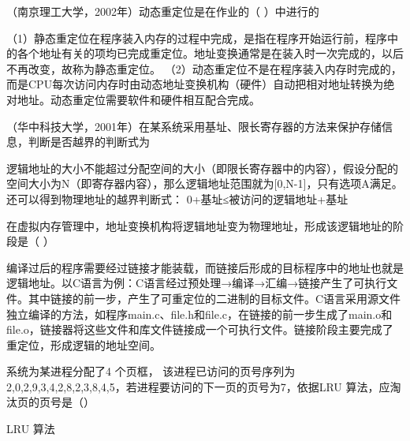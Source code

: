 \question （南京理工大学，2002年）动态重定位是在作业的（ ）中进行的
\par{}
\begin{solution}（1）静态重定位在程序装入内存的过程中完成，是指在程序开始运行前，程序中的各个地址有关的项均已完成重定位。地址变换通常是在装入时一次完成的，以后不再改变，故称为静态重定位。
（2）动态重定位不是在程序装入内存时完成的，而是CPU每次访问内存时由动态地址变换机构（硬件）自动把相对地址转换为绝对地址。动态重定位需要软件和硬件相互配合完成。
\end{solution}
\question （华中科技大学，2001年）在某系统采用基址、限长寄存器的方法来保护存储信息，判断是否越界的判断式为
\par{}
\begin{solution}逻辑地址的大小不能超过分配空间的大小（即限长寄存器中的内容），假设分配的空间大小为N（即寄存器内容），那么逻辑地址范围就为{[}0,N-1{]}，只有选项A满足。
还可以得到物理地址的越界判断式： 0+基址≤被访问的逻辑地址+基址
\end{solution}
\question 在虚拟内存管理中，地址变换机构将逻辑地址变为物理地址，形成该逻辑地址的阶段是（
）
\par{}
\begin{solution}编译过后的程序需要经过链接才能装载，而链接后形成的目标程序中的地址也就是逻辑地址。以C语言为例：C语言经过预处理→编译→汇编→链接产生了可执行文件。其中链接的前一步，产生了可重定位的二进制的目标文件。C语言采用源文件独立编译的方法，如程序main.c、file.h和file.c，在链接的前一步生成了main.o和file.o，链接器将这些文件和库文件链接成一个可执行文件。链接阶段主要完成了重定位，形成逻辑的地址空间。
\end{solution}
\question 系统为某进程分配了4 个页框，
该进程已访问的页号序列为2,0,2,9,3,4,2,8,2,3,8,4,5，若进程要访问的下一页的页号为7，依据LRU
算法，应淘汰页的页号是（）
\par{}
\begin{solution}LRU 算法
\end{solution}
